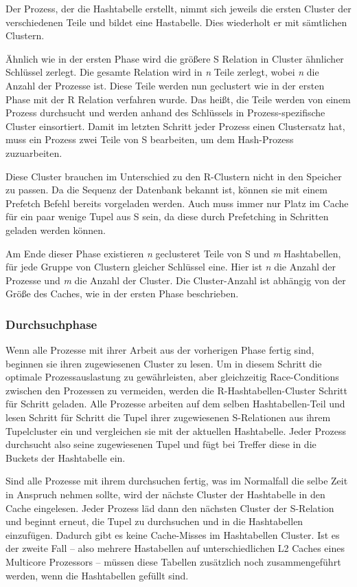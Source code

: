 Der Prozess, der die Hashtabelle erstellt, nimmt sich jeweils die ersten Cluster der verschiedenen Teile und bildet eine Hastabelle. Dies wiederholt er mit sämtlichen Clustern.

Ähnlich wie in der ersten Phase wird die größere S Relation in Cluster ähnlicher Schlüssel zerlegt. Die gesamte Relation wird in \textit{n} Teile zerlegt, wobei \textit{n} die Anzahl der Prozesse ist. Diese Teile werden nun geclustert wie in der ersten Phase mit der R Relation verfahren wurde. Das heißt, die Teile werden von einem Prozess durchsucht und werden anhand des Schlüssels in Prozess-spezifische Cluster einsortiert. Damit im letzten Schritt jeder Prozess einen Clustersatz hat, muss ein Prozess zwei Teile von S bearbeiten, um dem Hash-Prozess zuzuarbeiten.

Diese Cluster brauchen im Unterschied zu den R-Clustern nicht in den Speicher zu passen. Da die Sequenz der Datenbank bekannt ist, können sie mit einem Prefetch Befehl bereits vorgeladen werden. Auch muss immer nur Platz im Cache für ein paar wenige Tupel aus S sein, da diese durch Prefetching in Schritten geladen werden können.

Am Ende dieser Phase existieren \textit{n} geclusteret Teile von S und \textit{m} Hashtabellen, für jede Gruppe von Clustern gleicher Schlüssel eine. Hier ist \textit{n} die Anzahl der Prozesse und \textit{m} die Anzahl der Cluster. Die Cluster-Anzahl ist abhängig von der Größe des Caches, wie in der ersten Phase beschrieben.

\subsubsection*{Durchsuchphase}
\label{sec:AA_Hash-Join_Durchsuchphase}

Wenn alle Prozesse mit ihrer Arbeit aus der vorherigen Phase fertig sind, beginnen sie ihren zugewiesenen Cluster zu lesen. Um in diesem Schritt die optimale Prozessauslastung zu gewährleisten, aber gleichzeitig Race-Conditions zwischen den Prozessen zu vermeiden, werden die R-Hashtabellen-Cluster Schritt für Schritt geladen. Alle Prozesse arbeiten auf dem selben Hashtabellen-Teil und lesen Schritt für Schritt die Tupel ihrer zugewiesenen S-Relationen aus ihrem Tupelcluster ein und vergleichen sie mit der aktuellen Hashtabelle. Jeder Prozess durchsucht also seine zugewiesenen Tupel und fügt bei Treffer diese in die Buckets der Hashtabelle ein.

Sind alle Prozesse mit ihrem durchsuchen fertig, was im Normalfall die selbe Zeit in Anspruch nehmen sollte, wird der nächste Cluster der Hashtabelle in den Cache eingelesen. Jeder Prozess läd dann den nächsten Cluster der S-Relation und beginnt erneut, die Tupel zu durchsuchen und in die Hashtabellen einzufügen. Dadurch gibt es keine Cache-Misses im Hashtabellen Cluster. Ist es der zweite Fall – also mehrere Hastabellen auf unterschiedlichen L2 Caches eines Multicore Prozessors – müssen diese Tabellen zusätzlich noch zusammengeführt werden, wenn die Hashtabellen gefüllt sind.

